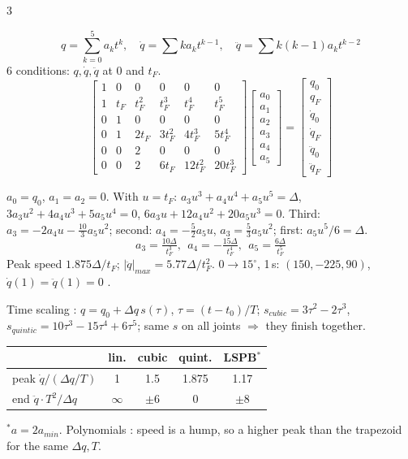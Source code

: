 \begin{multicols}{3}
\begin{fbx}[Quintic \pg{29}]
\[q=\textstyle\sum_{k=0}^5a_kt^k,\quad \dot q=\sum ka_kt^{k-1},\quad \ddot q=\sum k(k{-}1)a_kt^{k-2}\]
6 conditions: $q,\dot q,\ddot q$ at $0$ and $t_F$.
\[\begin{bmatrix}1&0&0&0&0&0\\1&t_F&t_F^2&t_F^3&t_F^4&t_F^5\\0&1&0&0&0&0\\0&1&2t_F&3t_F^2&4t_F^3&5t_F^4\\0&0&2&0&0&0\\0&0&2&6t_F&12t_F^2&20t_F^3\end{bmatrix}\!\begin{bmatrix}a_0\\a_1\\a_2\\a_3\\a_4\\a_5\end{bmatrix}=\begin{bmatrix}q_0\\q_F\\\dot q_0\\\dot q_F\\\ddot q_0\\\ddot q_F\end{bmatrix}\]
\end{fbx}
\begin{deriv}
$a_0=q_0$, $a_1=a_2=0$. With $u=t_F$: $a_3u^3{+}a_4u^4{+}a_5u^5=\Delta$, $3a_3u^2{+}4a_4u^3{+}5a_5u^4=0$, $6a_3u{+}12a_4u^2{+}20a_5u^3=0$. Third: $a_3=-2a_4u-\frac{10}3a_5u^2$; second: $a_4=-\frac52a_5u$, $a_3=\frac53a_5u^2$; first: $a_5u^5/6=\Delta$.
\[\boxed{a_3=\tfrac{10\Delta}{t_F^3},\ \ a_4=-\tfrac{15\Delta}{t_F^4},\ \ a_5=\tfrac{6\Delta}{t_F^5}}\]
Peak speed $1.875\Delta/t_F$; $|\ddot q|_{max}=5.77\Delta/t_F^2$. $0\to15^\circ$, 1\,s: $(150,-225,90)$, $\dot q(1)=\ddot q(1)=0$ \checkmark. \chk
\end{deriv}
Time scaling \added: $q=q_0+\Delta q\,s(\tau)$, $\tau=(t-t_0)/T$; $s_{cubic}=3\tau^2-2\tau^3$, $s_{quintic}=10\tau^3-15\tau^4+6\tau^5$; same $s$ on all joints $\Rightarrow$ they finish together.
\par\begin{tabularx}{\linewidth}{@{}>{\raggedright\arraybackslash}Xcccc@{}}\toprule
 & lin. & cubic & quint. & LSPB$^*$\\\midrule
 peak $\dot q/(\Delta q/T)$ & 1 & 1.5 & 1.875 & 1.17\\
 end $\ddot q\cdot T^2/\Delta q$ & $\infty$ & $\pm6$ & 0 & $\pm8$\\\bottomrule
\end{tabularx}
{\footnotesize $^*a=2a_{min}$. Polynomials : speed is a hump, so a higher peak than the trapezoid for the same $\Delta q,T$.} \chk


\end{multicols}
